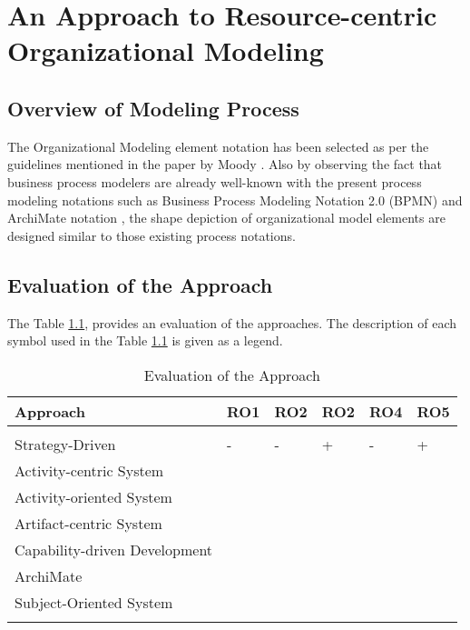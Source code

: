 \chapter{An Approach to Resource-centric Organizational Modeling}
\label{chap:approach}


\section{Overview of Modeling Process}
\label{sec:overviewmodelingprocess}
 The Organizational Modeling element notation has been selected as per the guidelines mentioned in the paper by Moody \cite{Moody2009}. Also by observing  the fact that business process modelers are already well-known with the present process modeling notations such as Business Process Modeling Notation 2.0 (BPMN) \cite{bpm2011} and ArchiMate notation \cite{arc2013}, the shape depiction of organizational model elements are designed similar to those existing process notations. 




\section{Evaluation of the Approach}
\label{sec:evaluationoftheapproach}

The Table \ref{tab:evaluationoftheapproach}, provides an evaluation of the approaches. The description of each symbol used in the  Table \ref{tab:evaluationoftheapproach} is given as a legend.


\begin{center}
	\begin{longtable}{p{5cm}p{2cm}p{2cm}p{2cm}p{2cm}p{2cm}} 
		\toprule 
		\textbf{Approach} & \textbf{RO1}  & \textbf{RO2}  & \textbf{RO2}  & \textbf{RO4}  & \textbf{RO5} \\
		\midrule
		\endfirsthead
		\\
	   	Strategy-Driven & -  & -  & +  & -  & + \\
	   	Activity-centric System  \\
	   	Activity-oriented System  \\
	   	Artifact-centric System  \\
	   	Capability-driven Development \\
	   	ArchiMate \\
	    Subject-Oriented System \\
		
		\bottomrule
		\caption{Evaluation of the Approach}
		\label{tab:evaluationoftheapproach}
	\end{longtable}	
\end{center}

